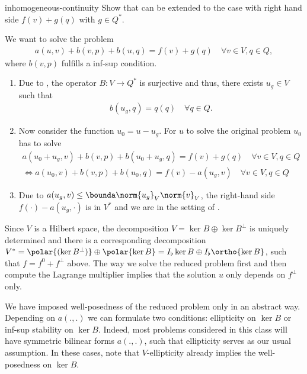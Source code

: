 \begin{Problem}{inhomogeneous-continuity}
  Show that  can be extended to the
  case with right hand side $f(v)+g(q)$ with $g\in Q^*$.

\begin{solution}
  We want to solve the problem
  \begin{align}
    a(u,v) + b(v,p) + b(u,q) = f(v)+g(q) \quad\forall v\in V, q\in Q,
  \end{align}
  where $b(v,p)$ fulfills a inf-sup condition.

  \begin{enumerate}
  \item Due to , the
    operator $B: V\to Q^*$ is surjective and thus, there exists
    $u_g\in V$ such that
    \begin{gather}
      b(u_g,q) = q(q) \quad\forall q\in Q.
    \end{gather}
  \item Now consider the function $u_0 = u-u_g$. For $u$ to solve the
    original problem $u_0$ has to solve
    \begin{align}
      a(u_0+u_g,v) + b(v,p) + b(u_0+u_g,q) = f(v)+g(q) \quad\forall v\in V, q\in Q\\
      \Leftrightarrow a(u_0,v) + b(v,p) + b(u_0,q) = f(v)-a(u_g,v) \quad\forall v\in V, q\in Q
    \end{align}
  \item Due to $a(u_g,v) \leq \bounda \norm{u_g}_V\norm{v}_V$,
    the right-hand side $f(\cdot)-a(u_g,\cdot)$ is in $V^*$
    and we are in the setting of
    .
  \end{enumerate}
\end{solution}
\end{Problem}

\begin{remark}
  Since $V$ is a Hilbert space, the decomposition
  $V = \ker B \oplus \ker B^\perp$ is uniquely determined and there is
  a corresponding decomposition $V^* = \polar{(\ker B^\perp)} \oplus \polar{\ker B} = I_\flat\ker B \oplus I_\flat \ortho{\ker B} $,
  such that $f = f^0+f^\perp$ above. The way we solve the reduced
  problem first and then compute the Lagrange multiplier implies that
  the solution $u$ only depends on $f^\perp$ only.
\end{remark}

\begin{remark}
  We have imposed well-posedness of the reduced problem only in an
  abstract way. Depending on $a(.,.)$ we can formulate two conditions:
  ellipticity on $\ker B$ or inf-sup stability on $\ker B$. Indeed,
  most problems considered in this class will have symmetric bilinear
  forms $a(.,.)$, such that ellipticity serves as our usual
  assumption.  In these cases, note that $V$-ellipticity already
  implies the well-posedness on $\ker B$.
\end{remark}


